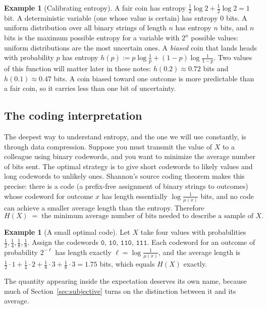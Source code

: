 \documentclass[10pt]{article}
\theoremstyle{definition}
\newtheorem{example}[theorem]{Example}
\theoremstyle{remark}
\begin{document}
\begin{example}[Calibrating entropy]
\label{ex:entropy-calibration}
A fair coin has entropy $\frac12 \log 2 + \frac12 \log 2 = 1$ bit. A deterministic variable (one whose value is certain) has entropy $0$ bits. A uniform distribution over all binary strings of length $n$ has entropy $n$ bits, and $n$ bits is the maximum possible entropy for a variable with $2^n$ possible values: uniform distributions are the most uncertain ones. A \emph{biased} coin that lands heads with probability $p$ has entropy $h(p) := p \log \frac1p + (1-p)\log\frac{1}{1-p}$. Two values of this function will matter later in these notes: $h(0.2) \approx 0.72$ bits and $h(0.1) \approx 0.47$ bits. A coin biased toward one outcome is more predictable than a fair coin, so it carries less than one bit of uncertainty.
\end{example}

\subsection{The coding interpretation}
\label{sec:coding}

The deepest way to understand entropy, and the one we will use constantly, is through data compression. Suppose you must transmit the value of $X$ to a colleague using binary codewords, and you want to minimize the average number of bits sent. The optimal strategy is to give short codewords to likely values and long codewords to unlikely ones. Shannon's source coding theorem makes this precise: there is a code (a prefix-free assignment of binary strings to outcomes) whose codeword for outcome $x$ has length essentially $\log \frac{1}{\mu(x)}$ bits, and no code can achieve a smaller average length than the entropy. Therefore
\[
H(X) \;=\; \text{the minimum average number of bits needed to describe a sample of } X .
\]

\begin{example}[A small optimal code]
Let $X$ take four values with probabilities $\frac12, \frac14, \frac18, \frac18$. Assign the codewords $\mathtt{0}$, $\mathtt{10}$, $\mathtt{110}$, $\mathtt{111}$. Each codeword for an outcome of probability $2^{-\ell}$ has length exactly $\ell = \log \frac{1}{\mu(x)}$, and the average length is $\frac12 \cdot 1 + \frac14 \cdot 2 + \frac18 \cdot 3 + \frac18 \cdot 3 = 1.75$ bits, which equals $H(X)$ exactly.
\end{example}

The quantity appearing inside the expectation deserves its own name, because much of Section~\ref{sec:subjective} turns on the distinction between it and its average.
\end{document}

